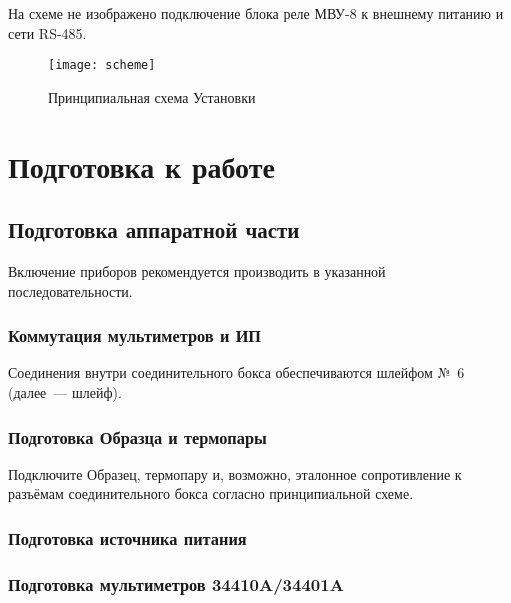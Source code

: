 \documentclass[12pt, a4paper, twocolumn]{report}
\begin{document}
На схеме не изображено подключение блока реле МВУ-8 к внешнему питанию и сети RS-485.

\begin{figure*}
\begin{center}
\texttt{[image: scheme]}
\end{center}
\caption{Принципиальная схема Установки}
\label{pic-scheme}
\end{figure*}

\chapter{Подготовка к работе}

\section{Подготовка аппаратной части}

Включение приборов рекомендуется производить в указанной последовательности.

\subsection{Коммутация мультиметров и ИП}

Соединения внутри соединительного бокса обеспечиваются шлейфом №~6 (далее~--- шлейф).



\subsection{Подготовка Образца и термопары}

Подключите Образец, термопару и, возможно, эталонное сопротивление к разъёмам соединительного бокса согласно принципиальной схеме.

\subsection{Подготовка источника питания}



\subsection{Подготовка мультиметров 34410A/34401A}


\end{document}
